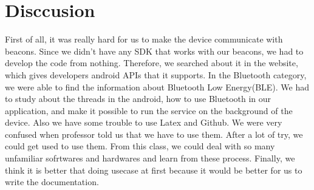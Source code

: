 \documentclass[conference]{IEEEtran}
\begin{document}
\section{Disccusion}
\quad First of all, it was really hard for us to make the device communicate with beacons.
Since we didn't have any SDK that works with our beacons, we had to develop the code from nothing. Therefore, we searched about it in the website, which gives developers android APIs that it supports. In the Bluetooth category, we were able to find the information about Bluetooth Low Energy(BLE). We had to study about the threads in the android, how to use Bluetooth in our application, and make it possible to run the service on the background of the device. Also we have some trouble to use Latex and Github. We were very confused when professor told us that we have to use them. After a lot of try, we could get used to use them. From this class, we could deal with so many unfamiliar sofrtwares and hardwares and learn from these process. Finally, we think it is better that doing usecase at first because it would be better for us to write the documentation.
%
%

\end{document}
